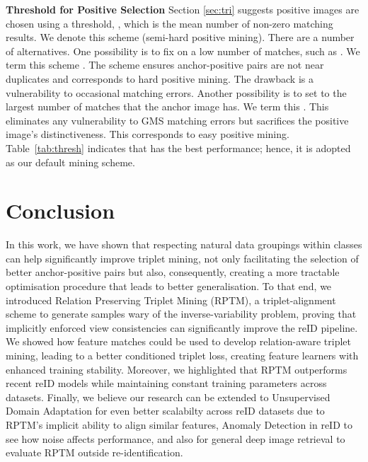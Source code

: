 \documentclass[10pt,twocolumn,letterpaper]{article}
\begin{document}
\textbf{Threshold for Positive Selection}
 Section \ref{sec:tri} suggests positive images are chosen using  a threshold, , which  is the mean number
of non-zero matching results. We denote this  scheme   (semi-hard positive mining). There are a number of  alternatives. One possibility is to fix  on a low number of matches, such as . We term this scheme .  
The scheme ensures anchor-positive pairs are not  near duplicates  
and  corresponds to hard positive mining.    The drawback is a vulnerability to occasional matching errors. Another possibility is to set  to the largest number of matches that the anchor image has. We term this  
 . This eliminates any vulnerability to GMS matching errors but
 sacrifices the  positive image's distinctiveness. This corresponds to easy positive mining.   Table~\ref{tab:thresh} indicates that  has the best performance; hence, it is adopted as our default mining scheme.

\section{Conclusion}

In this work, we have shown that respecting natural data groupings within classes can help significantly improve triplet mining, not only facilitating the selection of better anchor-positive pairs but also, consequently, creating a more tractable optimisation procedure that leads to better generalisation. 
To that end, we introduced Relation Preserving Triplet Mining (RPTM), a triplet-alignment scheme to generate samples wary of the inverse-variability problem, proving that implicitly enforced view consistencies can significantly improve the reID pipeline. 
We showed how feature matches could be used to develop relation-aware triplet mining, leading to a  better conditioned  triplet loss, creating feature learners with enhanced training stability.
Moreover, we highlighted that RPTM outperforms recent reID models while maintaining constant training parameters across datasets.
Finally, we believe our research can be extended to Unsupervised Domain Adaptation for even better scalabilty across reID datasets due to RPTM's implicit ability to align similar features, Anomaly Detection in reID to see how noise affects performance, and also for general deep image retrieval to evaluate RPTM outside re-identification.   



{\small


}
\end{document}
